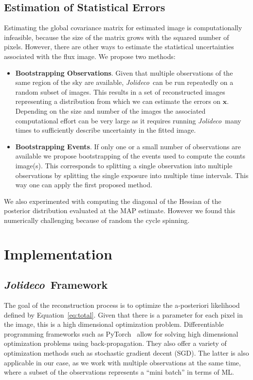 \documentclass[twocolumn]{aastex631}
\newcommand{\jolideco}{\textit{Jolideco}~}
\begin{document}
    \subsection{Estimation of Statistical Errors}
    Estimating the global covariance matrix for estimated image is computationally infeasible, because the size of the matrix grows with the squared number of pixels. However, there are other ways to estimate the statistical uncertainties associated with the flux image. We propose two methods:

    \begin{itemize}
    \item \textbf{Bootstrapping Observations}. Given that multiple observations of the same region of the sky are available, \jolideco can be run repeatedly on a random subset of images. This results in a set of reconstructed images representing a distribution from which we can estimate the errors on $\mathbf{x}$. Depending on the size and number of the images the associated computational effort can be very large as it requires running \jolideco many times to sufficiently describe uncertainty in the fitted image.

    \item \textbf{Bootstrapping Events}. If only one or a small number of observations are available we propose bootstrapping of the events used to compute the counts image(s). This corresponds to splitting a single observation into multiple observations by splitting the single exposure into multiple time intervals. This way one can apply the first proposed method.
    \end{itemize}

    We also experimented with computing the diagonal of the Hessian of the posterior distribution evaluated at the MAP estimate. However we found this numerically challenging because of random the cycle spinning. 


    \section{Implementation}
    \subsection{\jolideco Framework}
    The goal of the reconstruction process is to optimize the a-posteriori likelihood defined by Equation~\ref{eq:total}. Given that there is a parameter for each pixel in the image, this is a high dimensional optimization problem. Differentiable programming frameworks such as PyTorch~\citep{Pytorch2019} allow for solving high dimensional optimization problems using back-propagation. They also offer a variety of optimization methods such as stochastic gradient decent (SGD). The latter is also applicable in our case, as we work with multiple observations at the same time, where a subset of the observations represents a \enquote{mini batch} in terms of ML.
\end{document}
